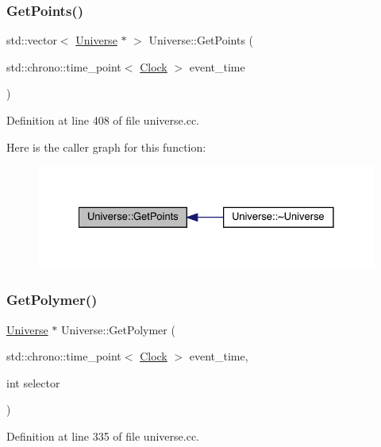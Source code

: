 \subsubsection{\texorpdfstring{Get\+Points()}{GetPoints()}}
{\footnotesize\ttfamily std\+::vector$<$ \hyperlink{class_universe}{Universe} $\ast$ $>$ Universe\+::\+Get\+Points (\begin{DoxyParamCaption}\item[{std\+::chrono\+::time\+\_\+point$<$ \hyperlink{universe_8h_a0ef8d951d1ca5ab3cfaf7ab4c7a6fd80}{Clock} $>$}]{event\+\_\+time }\end{DoxyParamCaption})}



Definition at line 408 of file universe.\+cc.

Here is the caller graph for this function\+:
\nopagebreak
\begin{figure}[H]
\begin{center}
\leavevmode
\includegraphics[width=328pt]{class_universe_a765c6c658b7a465cd92418690db846ae_icgraph}
\end{center}
\end{figure}
\mbox{\label{class_universe_a2d5d3924a7d7ffd2a5f47be9f137d86e}} 
\subsubsection{\texorpdfstring{Get\+Polymer()}{GetPolymer()}}
{\footnotesize\ttfamily \hyperlink{class_universe}{Universe} $\ast$ Universe\+::\+Get\+Polymer (\begin{DoxyParamCaption}\item[{std\+::chrono\+::time\+\_\+point$<$ \hyperlink{universe_8h_a0ef8d951d1ca5ab3cfaf7ab4c7a6fd80}{Clock} $>$}]{event\+\_\+time,  }\item[{int}]{selector }\end{DoxyParamCaption})}



Definition at line 335 of file universe.\+cc.

